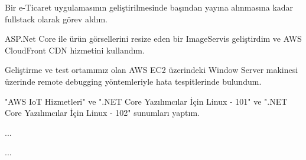 \begin{cventries}
        {
            \begin{cvitems}
                \item { Bir e-Ticaret uygulamasının geliştirilmesinde başından yayına alınmasına kadar fullstack olarak  görev aldım. }
                \item { ASP.Net Core ile ürün görsellerini resize eden bir ImageServis geliştirdim ve AWS CloudFront CDN hizmetini kullandım. }
                \item { Geliştirme ve test ortamımız olan AWS EC2 üzerindeki Window Server makinesi üzerinde remote debugging yöntemleriyle hata tespitlerinde bulundum. }
                \item { "AWS IoT Hizmetleri" ve ".NET Core Yazılımcılar İçin Linux - 101" ve ".NET Core Yazılımcılar İçin Linux - 102" sunumları yaptım. }
            \end{cvitems}
        }

        {
            \begin{cvitems}
                \item { ... }
            \end{cvitems}
        }
        
        {
            \begin{cvitems}
                \item { ... }
            \end{cvitems}
        }        
        
\end{cventries}
